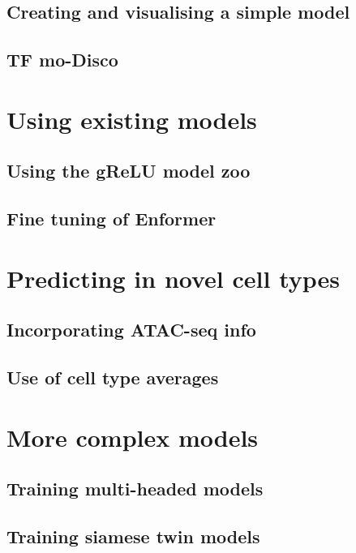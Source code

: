 \documentclass[
]{book}
\begin{document}
\chapter{Creating and visualising a simple model}\label{creating-and-visualising-a-simple-model}

\chapter{TF mo-Disco}\label{tf-mo-disco}

\part{Using existing models}\label{part-using-existing-models}

\chapter{Using the gReLU model zoo}\label{using-the-grelu-model-zoo}

\chapter{Fine tuning of Enformer}\label{fine-tuning-of-enformer}

\part{Predicting in novel cell types}\label{part-predicting-in-novel-cell-types}

\chapter{Incorporating ATAC-seq info}\label{incorporating-atac-seq-info}

\chapter{Use of cell type averages}\label{use-of-cell-type-averages}

\part{More complex models}\label{part-more-complex-models}

\chapter{Training multi-headed models}\label{training-multi-headed-models}

\chapter{Training siamese twin models}\label{training-siamese-twin-models}

  
\end{document}
